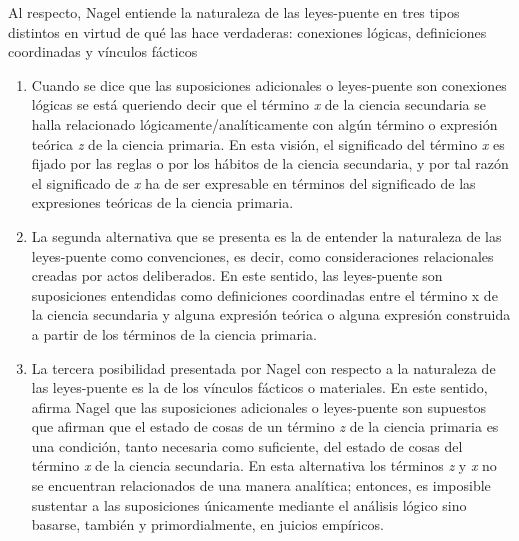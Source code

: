 \documentclass[]{book}
\begin{document}
Al respecto, Nagel entiende la naturaleza de las leyes-puente en tres
tipos distintos en virtud de qué las hace verdaderas: conexiones
lógicas, definiciones coordinadas y vínculos fácticos

\begin{enumerate}
\def\labelenumi{(\arabic{enumi})}
\item
  Cuando se dice que las suposiciones adicionales o leyes-puente son
  conexiones lógicas se está queriendo decir que el término \emph{x} de
  la ciencia secundaria se halla relacionado lógicamente/analíticamente
  con algún término o expresión teórica \emph{z} de la ciencia primaria.
  En esta visión, el significado del término \emph{x} es fijado por las
  reglas o por los hábitos de la ciencia secundaria, y por tal razón el
  significado de \emph{x} ha de ser expresable en términos del
  significado de las expresiones teóricas de la ciencia primaria.
\item
  La segunda alternativa que se presenta es la de entender la naturaleza
  de las leyes-puente como convenciones, es decir, como consideraciones
  relacionales creadas por actos deliberados. En este sentido, las
  leyes-puente son suposiciones entendidas como definiciones coordinadas
  entre el término x de la ciencia secundaria y alguna expresión teórica
  o alguna expresión construida a partir de los términos de la ciencia
  primaria.
\item
  La tercera posibilidad presentada por Nagel con respecto a la
  naturaleza de las leyes-puente es la de los vínculos fácticos o
  materiales. En este sentido, afirma Nagel que las suposiciones
  adicionales o leyes-puente son supuestos que afirman que el estado de
  cosas de un término \emph{z} de la ciencia primaria es una condición,
  tanto necesaria como suficiente, del estado de cosas del término
  \emph{x} de la ciencia secundaria. En esta alternativa los términos
  \emph{z} y \emph{x} no se encuentran relacionados de una manera
  analítica; entonces, es imposible sustentar a las suposiciones
  únicamente mediante el análisis lógico sino basarse, también y
  primordialmente, en juicios empíricos.
\end{enumerate}
\end{document}
